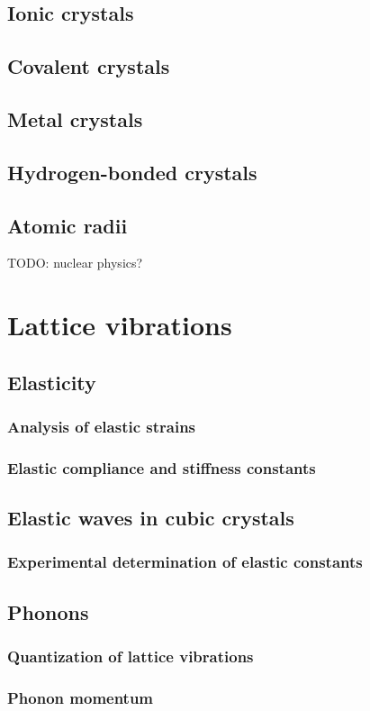 \section{Ionic crystals}
\section{Covalent crystals}
\section{Metal crystals}
\section{Hydrogen-bonded crystals}
\section{Atomic radii}
TODO: nuclear physics?

\chapter{Lattice vibrations}
\section{Elasticity}
\subsection{Analysis of elastic strains}
\subsection{Elastic compliance and stiffness constants}
\section{Elastic waves in cubic crystals}
\subsection{Experimental determination of elastic constants}
\section{Phonons}
\subsection{Quantization of lattice vibrations}
\subsection{Phonon momentum}
